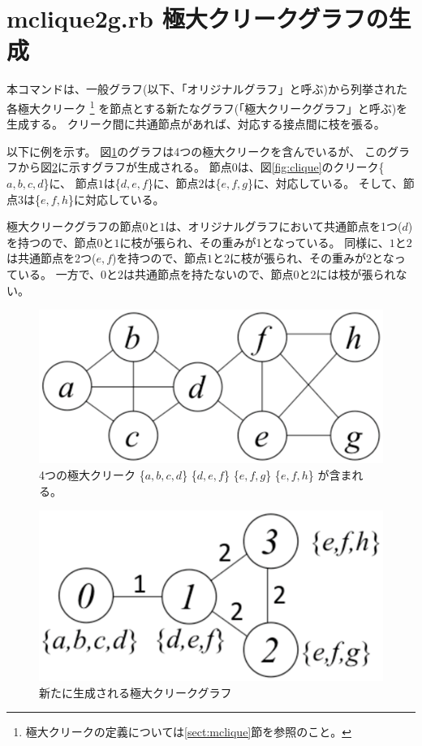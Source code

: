 
\section{mclique2g.rb 極大クリークグラフの生成\label{sect:mclique2g}}

本コマンドは、一般グラフ(以下、「オリジナルグラフ」と呼ぶ)から列挙された各極大クリーク
\footnote{極大クリークの定義については\ref{sect:mclique}節を参照のこと。}
を節点とする新たなグラフ(「極大クリークグラフ」と呼ぶ)を生成する。
クリーク間に共通節点があれば、対応する接点間に枝を張る。

以下に例を示す。
図\ref{fig:clique2g_1}のグラフは4つの極大クリークを含んでいるが、
このグラフから図\ref{fig:clique2g_2}に示すグラフが生成される。
節点$0$は、図\ref{fig:clique}のクリーク\{$a,b,c,d$\}に、
節点$1$は\{$d,e,f$\}に、節点$2$は\{$e,f,g$\}に、対応している。
そして、節点$3$は\{$e,f,h$\}に対応している。

極大クリークグラフの節点$0$と$1$は、オリジナルグラフにおいて共通節点を1つ($d$)を持つので、節点$0$と$1$に枝が張られ、その重みが1となっている。
同様に、$1$と$2$は共通節点を2つ($e,f$)を持つので、節点$1$と$2$に枝が張られ、その重みが2となっている。
一方で、$0$と$2$は共通節点を持たないので、節点$0$と$2$には枝が張られない。

\begin{figure}[htbp]
\begin{center}
\includegraphics[scale=0.5]{./clique2g_1.eps}
\caption{4つの極大クリーク
\{$a,b,c,d$\}
\{$d,e,f$\}
\{$e,f,g$\}
\{$e,f,h$\}
が含まれる。
\label{fig:clique2g_1}}
\end{center}
\end{figure} 

\begin{figure}[htbp]
\begin{center}
\includegraphics[scale=0.5]{./clique2g_2.eps}
\caption{新たに生成される極大クリークグラフ\label{fig:clique2g_2}}
\end{center}
\end{figure} 

